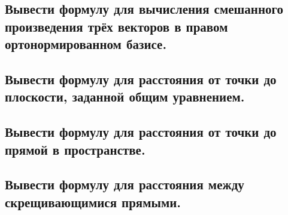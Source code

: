 \documentclass[a4paper, 10pt]{article}
\begin{document}
\subsection{Вывести формулу для вычисления смешанного произведения трёх векторов в правом ортонормированном базисе.}



\subsection{Вывести формулу для расстояния от точки до плоскости, заданной общим уравнением. }



\subsection{Вывести формулу для расстояния от точки до прямой в пространстве.}



\subsection{Вывести формулу для расстояния между скрещивающимися прямыми.}
\end{document}
